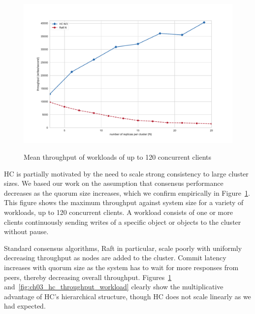 \begin{figure}
    \begin{center}
        \includegraphics[width=5in]{figures/ch03_scaling_consensus.pdf}
    \end{center}
    \renewcommand{\baselinestretch}{1}
    \small\normalsize

    \begin{quote}
        \caption[Scaling Consensus HC vs. Raft]{Mean throughput of workloads of up to 120 concurrent clients}
        \label{fig:ch03_scaling_consensus}
    \end{quote}
\end{figure}
\renewcommand{\baselinestretch}{2}
\small\normalsize

HC is partially motivated by the need to scale strong consistency to large cluster sizes.
We based our work on the assumption that consensus performance decreases as the quorum size increases, which we confirm empirically in Figure~\ref{fig:ch03_scaling_consensus}.
This figure shows the maximum throughput against system size for a variety of workloads, up to 120 concurrent clients.
A workload consists of one or more clients continuously sending writes of a specific object or objects to the cluster without pause.

Standard consensus algorithms, Raft in particular, scale poorly with uniformly decreasing throughput as nodes are added to the cluster.
Commit latency increases with quorum size as the system has to wait for more responses from peers, thereby decreasing overall throughput.
Figures~\ref{fig:ch03_scaling_consensus} and~\ref{fig:ch03_hc_throughput_workload} clearly show the multiplicative advantage of HC's hierarchical structure, though HC does not scale linearly as we had expected.

